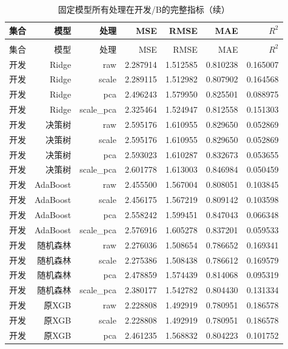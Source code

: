 \begingroup
\small
\renewcommand{\arraystretch}{1.08}
\setlength{\tabcolsep}{5pt}
\begin{longtable}{lrrrrrr}
\caption{固定模型所有处理在开发/B的完整指标}\label{tab:holdout-all}\\
\toprule
集合 & 模型 & 处理 & MSE & RMSE & MAE & $R^2$ \\
\midrule
\endfirsthead
\caption[]{固定模型所有处理在开发/B的完整指标（续）}\\
\toprule
集合 & 模型 & 处理 & MSE & RMSE & MAE & $R^2$ \\
\midrule
\endhead
开发 & Ridge & raw & 2.287914 & 1.512585 & 0.810238 & 0.165007 \\
开发 & Ridge & scale & 2.289115 & 1.512982 & 0.807902 & 0.164568 \\
开发 & Ridge & pca & 2.496243 & 1.579950 & 0.825501 & 0.088975 \\
开发 & Ridge & scale\_pca & 2.325464 & 1.524947 & 0.812558 & 0.151303 \\
开发 & 决策树 & raw & 2.595176 & 1.610955 & 0.829650 & 0.052869 \\
开发 & 决策树 & scale & 2.595176 & 1.610955 & 0.829650 & 0.052869 \\
开发 & 决策树 & pca & 2.593023 & 1.610287 & 0.832673 & 0.053655 \\
开发 & 决策树 & scale\_pca & 2.601778 & 1.613003 & 0.846984 & 0.050459 \\
开发 & AdaBoost & raw & 2.455500 & 1.567004 & 0.808051 & 0.103845 \\
开发 & AdaBoost & scale & 2.456175 & 1.567219 & 0.809142 & 0.103598 \\
开发 & AdaBoost & pca & 2.558242 & 1.599451 & 0.847043 & 0.066348 \\
开发 & AdaBoost & scale\_pca & 2.576916 & 1.605278 & 0.837201 & 0.059533 \\
开发 & 随机森林 & raw & 2.276036 & 1.508654 & 0.786652 & 0.169341 \\
开发 & 随机森林 & scale & 2.275386 & 1.508438 & 0.786612 & 0.169579 \\
开发 & 随机森林 & pca & 2.478859 & 1.574439 & 0.814068 & 0.095319 \\
开发 & 随机森林 & scale\_pca & 2.380177 & 1.542782 & 0.804430 & 0.131334 \\
开发 & 原XGB & raw & 2.228808 & 1.492919 & 0.780951 & 0.186578 \\
开发 & 原XGB & scale & 2.228808 & 1.492919 & 0.780951 & 0.186578 \\
开发 & 原XGB & pca & 2.461235 & 1.568832 & 0.804223 & 0.101752 \\

\end{longtable}
